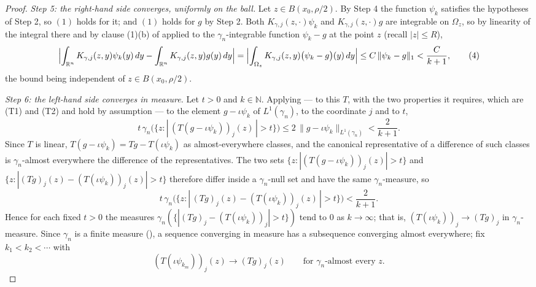 \begin{proof}
\emph{Step 5: the right-hand side converges, uniformly on the ball.}
Let $z \in B(x_0,\rho/2)$.  By Step 4 the function $\psi_k$ satisfies the
hypotheses of Step 2, so $(1)$ holds for it; and $(1)$ holds for $g$ by Step 2.
Both $K_{\gamma,j}(z,\cdot)\psi_k$ and $K_{\gamma,j}(z,\cdot)g$ are integrable
on $\Omega_z$, so by linearity of the integral there and by clause (1)(b) of
 applied to the $\gamma_n$-integrable
function $\psi_k - g$ at the point $z$ (recall $|z| \leq R$),
\begin{equation*}
  \Bigl|\int_{\mathbb{R}^n}K_{\gamma,j}(z,y)\psi_k(y)\,dy
        - \int_{\mathbb{R}^n}K_{\gamma,j}(z,y)g(y)\,dy\Bigr|
  = \Bigl|\int_{\Omega_z}K_{\gamma,j}(z,y)\bigl(\psi_k-g\bigr)(y)\,dy\Bigr|
  \leq C\,\|\psi_k - g\|_1 < \frac{C}{k+1} , \tag{4}
\end{equation*}
the bound being independent of $z \in B(x_0,\rho/2)$.

\emph{Step 6: the left-hand side converges in measure.}
Let $t > 0$ and $k \in \mathbb{N}$.  Applying
 --- to this $T$, with the two properties it
requires, which are (T1) and (T2) and hold by assumption --- to the element
$g - \iota\psi_k$ of $L^1(\gamma_n)$, to the coordinate $j$ and to $t$,
\[
  t\,\gamma_n\bigl(\{z : |\,(T(g - \iota\psi_k))_j(z)\,| > t\}\bigr)
    \leq 2\,\|g-\iota\psi_k\|_{L^1(\gamma_n)} < \frac{2}{k+1} .
\]
Since $T$ is linear, $T(g-\iota\psi_k) = Tg - T(\iota\psi_k)$ as
almost-everywhere classes, and the canonical representative of a difference of
such classes is $\gamma_n$-almost everywhere the difference of the
representatives.  The two sets
$\{z : |(T(g-\iota\psi_k))_j(z)| > t\}$ and
$\{z : |(Tg)_j(z) - (T(\iota\psi_k))_j(z)| > t\}$ therefore differ inside a
$\gamma_n$-null set and have the same $\gamma_n$-measure, so
\[
  t\,\gamma_n\bigl(\{z : |\,(Tg)_j(z) - (T(\iota\psi_k))_j(z)\,| > t\}\bigr)
    < \frac{2}{k+1} .
\]
Hence for each fixed $t>0$ the measures
$\gamma_n(\{|(Tg)_j - (T(\iota\psi_k))_j| > t\})$ tend to $0$ as
$k \to \infty$; that is, $(T(\iota\psi_k))_j \to (Tg)_j$ in
$\gamma_n$-measure.  Since $\gamma_n$ is a finite measure
(), a sequence converging in measure has a subsequence
converging almost everywhere; fix $k_1 < k_2 < \cdots$ with
\begin{equation*}
  (T(\iota\psi_{k_m}))_j(z) \longrightarrow (Tg)_j(z)
  \qquad\text{for } \gamma_n\text{-almost every } z . \tag{5}
\end{equation*}


\end{proof}
